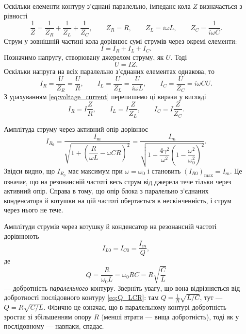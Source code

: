 Оскільки елементи контуру з'єднані паралельно, імпеданс кола $Z$ визначається з рівності
\begin{equation}\label{eq:parallel_impedance}
	\frac{1}{Z} = \frac{1}{Z_R} + \frac{1}{Z_L} + \frac{1}{Z_C}, \qquad
	Z_R = R, \qquad Z_L = i\omega L, \qquad Z_C = \frac{1}{i\omega C}.
\end{equation}
Струм у зовнішній частині кола дорівнює сумі струмів через окремі елементи:
\begin{equation}\label{eq:current_sum}
	I = I_R + I_L + I_C.
\end{equation}
Позначимо напругу, створювану джерелом струму, як $U$. Тоді
\begin{equation}\label{eq:voltage_current}
	U = IZ.
\end{equation}
Оскільки напруга на всіх паралельно з'єднаних елементах однакова, то
\begin{equation}\label{eq:branch_currents}
	I_R = \frac{U}{Z_R} = \frac{U}{R}, \qquad
	I_L = \frac{U}{Z_L} = \frac{U}{i\omega L}, \qquad
	I_C = \frac{U}{Z_C} = i\omega C U.
\end{equation}
З урахуванням \eqref{eq:voltage_current} перепишемо ці вирази у вигляді
\begin{equation}\label{eq:branch_currents_Z}
	I_R = I\frac{Z}{R}, \qquad
	I_L = I\frac{Z}{Z_L}, \qquad
	I_C = I\frac{Z}{Z_C}.
\end{equation}

Амплітуда струму через активний опір дорівнює
\begin{equation}\label{eq:IR_amplitude}
	I_{R_0} = \frac{I_m}{\sqrt{1 + \left(\dfrac{R}{\omega L} - \omega C R\right)^2}}
	= \frac{I_m}{\sqrt{1 + \dfrac{4\gamma^2}{\omega^2}\left(1 - \dfrac{\omega^2}{\omega_0^2}\right)^2}}.
\end{equation}
Звідси видно, що $I_{R_0}$ має максимум при $\omega = \omega_0$ і становить $(I_{R0})_{\max} = I_m$. Це означає, що на резонансній частоті весь струм від джерела тече тільки через активний опір. Справа в тому, що опір блока з паралельно з'єднаних конденсатора й котушки на цій частоті обертається в нескінченність, і струм через нього не тече.

Амплітуди струмів через котушку й конденсатор на резонансній частоті дорівнюють
\begin{equation}\label{eq:resonance_currents_Q}
	I_{L0} = I_{C0} = \frac{I_m}{Q},
\end{equation}
де
\begin{equation}\label{eq:Q_parallel}
	Q = \frac{R}{\omega_0 L} = \omega_0 R C = R\sqrt{\frac{C}{L}}
\end{equation}
--- добротність \emph{паралельного} контуру. Зверніть увагу, що вона відрізняється від добротності послідовного контуру \eqref{eq:Q_LCR}: там $Q = \frac{1}{R}\sqrt{L/C}$, тут --- $Q = R\sqrt{C/L}$. Фізично це означає, що в паралельному контурі добротність зростає зі збільшенням опору $R$ (менші втрати --- вища добротність), тоді як у послідовному --- навпаки, спадає.


